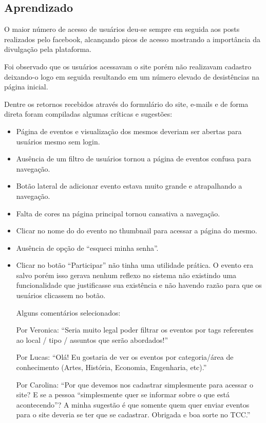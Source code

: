 \subsection{Aprendizado}
\par O maior número de acesso de usuários deu-se sempre em seguida aos posts realizados pelo facebook, alcançando picos de acesso mostrando a importância da divulgação pela plataforma.
\par Foi observado que os usuários acessavam o site porém não realizavam cadastro deixando-o logo em seguida resultando em um número elevado de desistências na página inicial.
\par Dentre os retornos recebidos através do formulário do site, e-mails e de forma direta foram compiladas algumas críticas e sugestões:
\begin{itemize}
\item Página de eventos e visualização dos mesmos deveriam ser abertas para usuários mesmo sem login.
\item Ausência de um filtro de usuários tornou a página de eventos confusa para navegação.
\item Botão lateral de adicionar evento estava muito grande e atrapalhando a navegação.
\item Falta de cores na página principal tornou cansativa a navegação.
\item Clicar no nome do do evento no thumbnail para acessar a página do mesmo.
\item Ausência de opção de ``esqueci minha senha''.
\item Clicar no botão ``Participar'' não tinha uma utilidade prática. O evento era salvo porém isso gerava nenhum reflexo no sistema não existindo uma funcionalidade que justificasse sua existência e não havendo razão para que os usuários clicassem no botão.
\par Alguns comentários selecionados:

\par Por Veronica: ``Seria muito legal poder filtrar os eventos por tags referentes ao local / tipo / assuntos que serão abordados!''

\par Por Lucas: ``Olá! Eu gostaria de ver os eventos por categoria/área de conhecimento (Artes, História, Economia, Engenharia, etc).''

\par Por Carolina: ``Por que devemos nos cadastrar simplesmente para acessar o site? E se a pessoa ``simplesmente quer se informar sobre o que está acontecendo''? A minha sugestão é que somente quem quer enviar eventos para o site deveria se ter que se cadastrar. Obrigada e boa sorte no TCC.''


\end{itemize}
